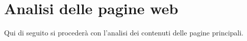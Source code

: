 \section{Analisi delle pagine web}
Qui di seguito si procederà con l'analisi dei contenuti delle pagine principali.
